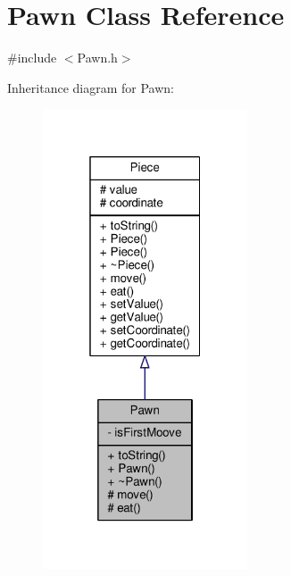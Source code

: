 \hypertarget{class_pawn}{}\section{Pawn Class Reference}
\label{class_pawn}


{\ttfamily \#include $<$Pawn.\+h$>$}



Inheritance diagram for Pawn\+:\nopagebreak
\begin{figure}[H]
\begin{center}
\leavevmode
\includegraphics[width=172pt]{class_pawn__inherit__graph}
\end{center}
\end{figure}


